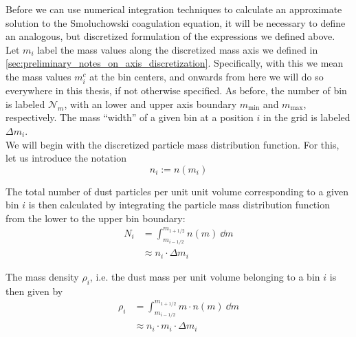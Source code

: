 

    Before we can use numerical integration techniques to calculate an approximate solution to 
    the Smoluchowski coagulation equation, it will be necessary to define an analogous, 
    but discretized formulation of the expressions we defined above. \\

    Let $m_i$ label the mass values along the discretized mass axis we defined in
    \cref{sec:preliminary_notes_on_axis_discretization}.
    Specifically, with this we mean the mass values $m_i^c$ at the bin centers, and onwards 
    from here we will do so everywhere in this thesis, if not otherwise specified. 
    As before, the number of bin is labeled $\mathcal N_m$, with an lower and upper axis 
    boundary $m_\text{min}$ and $m_\text{max}$, respectively. The mass ``width'' of a given bin 
    at a position $i$ in the grid is labeled $\Delta m_i$. \\

    We will begin with the discretized particle mass distribution function.
    For this, let us introduce the notation
    \begin{equation}
        \label{eq:discrete_formulation_of_particle_mass_distribution}
        n_i := n(m_i)
    \end{equation}

    The total number of dust particles per unit unit volume corresponding to a given bin $i$ 
    is then calculated by integrating the particle mass distribution function from the lower 
    to the upper bin boundary:
    \begin{align}
        \label{eq:relationship_between_dust_particle_mass_distribution_and_particle_number_density}
        N_i 
        &= \int_{m_{i-1/2}}^{m_{1+1/2}}n(m)\ \dd m \\
        &\approx n_i \cdot \Delta m_i 
    \end{align}
    
    The mass density $\rho_i$, i.e. the dust mass per unit volume belonging to a bin $i$ is 
    then given by
    \begin{align}
        \rho_i 
        &= \int_{m_{i-1/2}}^{m_{1+1/2}} m \cdot n(m)\ \dd m \\
        &\approx n_i \cdot m_i \cdot \Delta m_i 
    \end{align}
    
